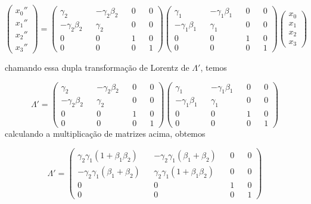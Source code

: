 \documentclass[10pt,a4paper]{article}
\begin{document}
   \begin{equation}\nonumber
 	\left(\begin{matrix}
 		x_0''\\
 		x_1''\\
 		x_2''\\
 		x_3''
 	\end{matrix}\right) = \left(\begin{matrix}
 		\gamma_2&&-\gamma_2\beta_2&&0&&0\\
 		-\gamma_2\beta_2&&\gamma_2&&0&&0\\
 		0&&0&&1&&0\\
 		0&&0&&0&&1
 	\end{matrix}\right)\left(\begin{matrix}
 	\gamma_1&&-\gamma_1\beta_1&&0&&0\\
 	-\gamma_1\beta_1&&\gamma_1&&0&&0\\
 	0&&0&&1&&0\\
 	0&&0&&0&&1
 \end{matrix}\right)\left(\begin{matrix}
 x_0\\
 x_1\\
 x_2\\
 x_3
\end{matrix}\right)
 \end{equation}
 
 chamando essa dupla transformação de Lorentz de $\Lambda'$, temos
 
 \begin{equation}\nonumber
 	\Lambda' = \left(\begin{matrix}
 		\gamma_2&&-\gamma_2\beta_2&&0&&0\\
 		-\gamma_2\beta_2&&\gamma_2&&0&&0\\
 		0&&0&&1&&0\\
 		0&&0&&0&&1
 	\end{matrix}\right)\left(\begin{matrix}
 		\gamma_1&&-\gamma_1\beta_1&&0&&0\\
 		-\gamma_1\beta_1&&\gamma_1&&0&&0\\
 		0&&0&&1&&0\\
 		0&&0&&0&&1
 	\end{matrix}\right)
 \end{equation}
calculando a multiplicação de matrizes acima, obtemos


\begin{equation}\nonumber
	\Lambda' = \left(\begin{matrix}
		\gamma_2\gamma_1(1+\beta_1\beta_2)&&-\gamma_2\gamma_1(\beta_1+\beta_2)&&0&&0\\
		-\gamma_2\gamma_1(\beta_1+\beta_2)&&\gamma_2\gamma_1(1+\beta_1\beta_2)&&0&&0\\
		0&&0&&1&&0\\
		0&&0&&0&&1
	\end{matrix}\right)
\end{equation}
\end{document}
